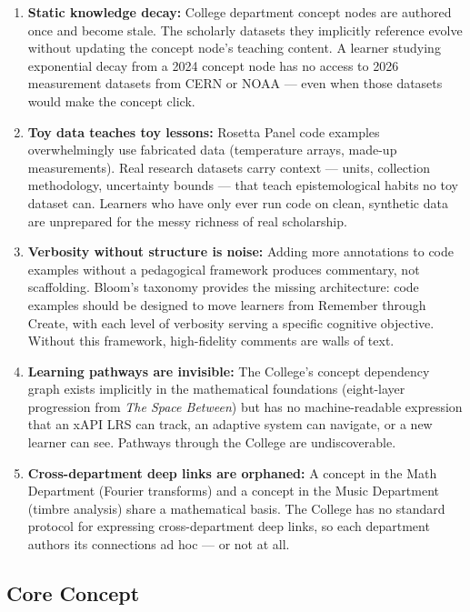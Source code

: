 \documentclass[11pt,letterpaper]{article}
\begin{document}
\begin{enumerate}
  \item \textbf{Static knowledge decay:} College department concept nodes are authored once and become stale. The scholarly datasets they implicitly reference evolve without updating the concept node's teaching content. A learner studying exponential decay from a 2024 concept node has no access to 2026 measurement datasets from CERN or NOAA --- even when those datasets would make the concept click.

  \item \textbf{Toy data teaches toy lessons:} Rosetta Panel code examples overwhelmingly use fabricated data (temperature arrays, made-up measurements). Real research datasets carry context --- units, collection methodology, uncertainty bounds --- that teach epistemological habits no toy dataset can. Learners who have only ever run code on clean, synthetic data are unprepared for the messy richness of real scholarship.

  \item \textbf{Verbosity without structure is noise:} Adding more annotations to code examples without a pedagogical framework produces commentary, not scaffolding. Bloom's taxonomy provides the missing architecture: code examples should be designed to move learners from Remember through Create, with each level of verbosity serving a specific cognitive objective. Without this framework, high-fidelity comments are walls of text.

  \item \textbf{Learning pathways are invisible:} The College's concept dependency graph exists implicitly in the mathematical foundations (eight-layer progression from \textit{The Space Between}) but has no machine-readable expression that an xAPI LRS can track, an adaptive system can navigate, or a new learner can see. Pathways through the College are undiscoverable.

  \item \textbf{Cross-department deep links are orphaned:} A concept in the Math Department (Fourier transforms) and a concept in the Music Department (timbre analysis) share a mathematical basis. The College has no standard protocol for expressing cross-department deep links, so each department authors its connections ad hoc --- or not at all.
\end{enumerate}

\subsection{Core Concept}
\end{document}
